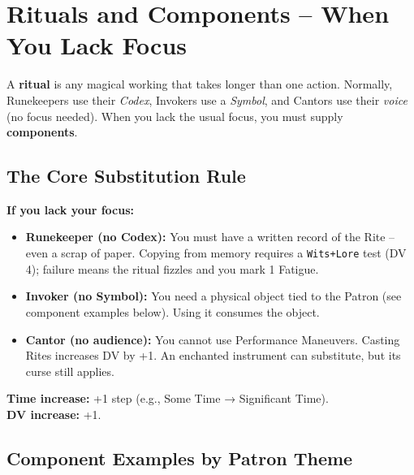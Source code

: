 \documentclass[10pt,a5paper]{book}
\begin{document}
\clearpage

\clearpage

\chapter{Rituals and Components – When You Lack Focus}

A \textbf{ritual} is any magical working that takes longer than one action. Normally, Runekeepers use their \textit{Codex}, Invokers use a \textit{Symbol}, and Cantors use their \textit{voice} (no focus needed). When you lack the usual focus, you must supply \textbf{components}.

\section{The Core Substitution Rule}

\begin{ritualnote}
\textbf{If you lack your focus:}
\begin{itemize}
    \item \textbf{Runekeeper (no Codex):} You must have a written record of the Rite – even a scrap of paper. Copying from memory requires a \texttt{Wits+Lore} test (DV 4); failure means the ritual fizzles and you mark 1 Fatigue.
    \item \textbf{Invoker (no Symbol):} You need a physical object tied to the Patron (see component examples below). Using it consumes the object.
    \item \textbf{Cantor (no audience):} You cannot use Performance Maneuvers. Casting Rites increases DV by +1. An enchanted instrument can substitute, but its curse still applies.
\end{itemize}
\textbf{Time increase:} +1 step (e.g., Some Time → Significant Time). \\
\textbf{DV increase:} +1.
\end{ritualnote}

\section{Component Examples by Patron Theme}
\end{document}
